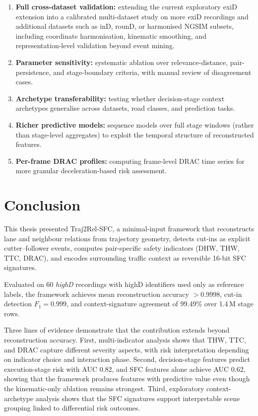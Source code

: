 \documentclass[12pt,a4paper,twoside,openright]{report}
\newcommand{\FrameworkName}{Traj2Rel-SFC}
\begin{document}
    \begin{enumerate}[leftmargin=1.6em]
  \item \textbf{Full cross-dataset validation:} extending the current exploratory exiD extension into a calibrated multi-dataset study on more exiD recordings and additional datasets such as inD, rounD, or harmonised NGSIM subsets, including coordinate harmonisation, kinematic smoothing, and representation-level validation beyond event mining.
  \item \textbf{Parameter sensitivity:} systematic ablation over relevance-distance, pair-persistence, and stage-boundary criteria, with manual review of disagreement cases.
  \item \textbf{Archetype transferability:} testing whether decision-stage context archetypes generalise across datasets, road classes, and prediction tasks.
  \item \textbf{Richer predictive models:} sequence models over full stage windows (rather than stage-level aggregates) to exploit the temporal structure of reconstructed features.
  \item \textbf{Per-frame DRAC profiles:} computing frame-level DRAC time series for more granular deceleration-based risk assessment.
    \end{enumerate}

    \chapter{Conclusion}
    \label{chap:conclusion}

    This thesis presented \FrameworkName{}, a minimal-input framework that reconstructs lane and neighbour relations from trajectory geometry, detects cut-ins as explicit cutter--follower events, computes pair-specific safety indicators (DHW, THW, TTC, DRAC), and encodes surrounding traffic context as reversible 16-bit SFC signatures.

    Evaluated on 60 \textit{highD} recordings with highD identifiers used only as reference labels, the framework achieves mean reconstruction accuracy $>$0.9998, cut-in detection $F_1 = 0.999$, and context-signature agreement of 99.49\% over 1.4\,M stage rows.

    Three lines of evidence demonstrate that the contribution extends beyond reconstruction accuracy. First, multi-indicator analysis shows that THW, TTC, and DRAC capture different severity aspects, with risk interpretation depending on indicator choice and interaction phase. Second, decision-stage features predict execution-stage risk with AUC 0.82, and SFC features alone achieve AUC 0.62, showing that the framework produces features with predictive value even though the kinematic-only ablation remains strongest. Third, exploratory context-archetype analysis shows that the SFC signatures support interpretable scene grouping linked to differential risk outcomes.
\end{document}
